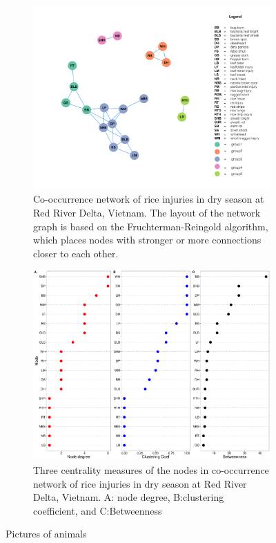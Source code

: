 \begin{figure}
    \centering
    \begin{subfigure}[b]{1\textwidth}
        \includegraphics[width = 1\textwidth]{figures/networkRR_ds/networkRR_ds.pdf}
        \caption{Co-occurrence network of rice injuries in dry season at Red River Delta, Vietnam. The layout of the network graph is based on the Fruchterman-Reingold algorithm, which places nodes with stronger or more connections closer to each other.}
        \label{fig:gull}
    \end{subfigure}
    \begin{subfigure}[b]{1\textwidth}
        \includegraphics[width = 1\textwidth]{figures/nodepropRR_ds/nodepropRR_ds.pdf}
        \caption{Three centrality measures of the nodes in co-occurrence network of rice injuries in dry season at Red River Delta, Vietnam. A: node degree, B:clustering coefficient, and C:Betweenness}
        \label{fig:nodepropCP_ds}
    \end{subfigure}
    \caption{Pictures of animals}
    \label{fig:animals}
\end{figure}


